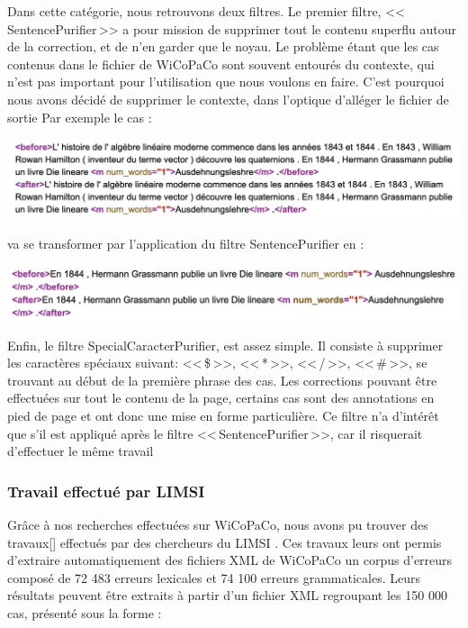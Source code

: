 \documentclass[11pt]{article}
\begin{document}
Dans cette cat\'{e}gorie, nous retrouvons deux filtres. Le premier filtre, <<\,SentencePurifier\,>> a pour mission de supprimer tout le contenu superflu autour de la correction, et de n'en garder que le noyau. Le probl\`{e}me \'{e}tant que les cas contenus dans le fichier de WiCoPaCo sont souvent entour\'{e}s du contexte, qui n'est pas important pour l'utilisation que nous voulons en faire. C'est pourquoi nous avons d\'{e}cid\'{e} de supprimer le contexte, dans l'optique d'all\'{e}ger le fichier de sortie
Par exemple le cas : 

\begin{center}
\includegraphics[width=14cm]{exemple14.png} %
\end{center}
va se transformer par l'application du filtre SentencePurifier en : 
\begin{center}
\includegraphics[width=14cm]{exemple15.png} %
\end{center}
Enfin, le filtre SpecialCaracterPurifier, est assez simple. Il consiste \`{a} supprimer les caract\`{e}res sp\'{e}ciaux suivant: <<\,\$\,>>, <<\,*\,>>, <<\,/\,>>, <<\,\#\,>>, se trouvant au d\'{e}but de la premi\`{e}re phrase des cas. Les corrections pouvant \^{e}tre effectu\'{e}es sur tout le contenu de la page, certains cas sont des annotations en pied de page et ont donc une mise en forme particuli\`{e}re.
Ce filtre n'a d'int\'{e}r\^{e}t que s'il est appliqu\'{e} apr\`{e}s le filtre <<\,SentencePurifier\,>>, car il risquerait d'effectuer le m\^{e}me travail


\subsubsection{Travail effectu\'{e} par LIMSI}

Gr\^{a}ce \`{a} nos recherches effectu\'{e}es sur WiCoPaCo, nous avons pu trouver des travaux[\cite[1]{1}] effectu\'{e}s par des chercheurs du LIMSI \autocite[4]{https://www.limsi.fr/fr/}. Ces travaux leurs ont permis d'extraire automatiquement des fichiers XML de WiCoPaCo un corpus d'erreurs compos\'{e} de 72 483 erreurs lexicales et 74 100 erreurs grammaticales. Leurs r\'{e}sultats peuvent \^{e}tre extraits 
\`{a} partir d'un fichier XML regroupant les 150 000 cas, pr\'{e}sent\'{e} sous la forme :
\end{document}

